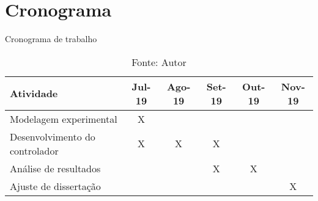 \chapter{Cronograma}
\label{ch:cronograma}

\begin{table}[h]
	\centering
	\caption{Cronograma de trabalho}
	\label{tab:cronograma}
	\begin{tabular}{lccccc} \toprule
		{Atividade} 	                & {Jul-19}	& {Ago-19}	& {Set-19}  & {Out-19}  & {Nov-19}  \\ \midrule
        Modelagem experimental          & X         &           &           &           &           \\
        Desenvolvimento do controlador  & X         & X         & X         &           &           \\
        Análise de resultados	        &           &           & X         & X         &           \\
        Ajuste de dissertação           &           &           &           &           & X        	\\ \bottomrule
	\end{tabular}
	\caption*{Fonte: Autor}
\end{table}
